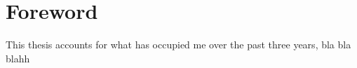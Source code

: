 

\chapter*{Foreword}
 {}





This thesis accounts for what has occupied me over the past three years, bla bla blahh 
